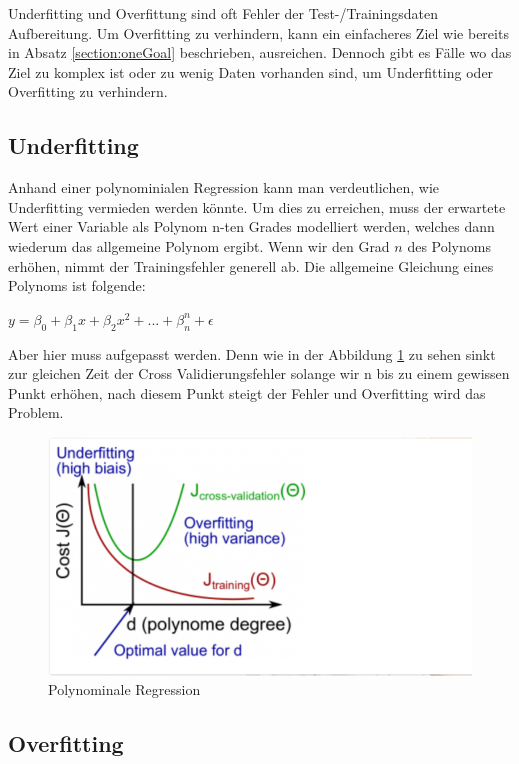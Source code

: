 \documentclass[12pt,oneside,a4paper,parskip]{scrbook}
\begin{document}
Underfitting und Overfittung sind oft Fehler der Test-/Trainingsdaten Aufbereitung. Um Overfitting zu verhindern, kann ein einfacheres Ziel wie bereits in Absatz \ref{section:oneGoal} beschrieben, ausreichen. Dennoch gibt es Fälle wo das Ziel zu komplex ist oder zu wenig Daten vorhanden sind, um Underfitting oder Overfitting zu verhindern.

\subsection{Underfitting}

Anhand einer polynominialen Regression kann man verdeutlichen, wie Underfitting vermieden werden könnte. Um dies zu erreichen, muss der erwartete Wert einer Variable als Polynom n-ten Grades modelliert werden, welches dann wiederum das allgemeine Polynom ergibt. Wenn wir den Grad ${n}$ des Polynoms erhöhen, nimmt der Trainingsfehler generell ab. Die allgemeine Gleichung eines Polynoms ist folgende:

${\displaystyle y=\beta_{0}+\beta_{1}x+\beta_{2}x^{2}+...+\beta_{n}^n+\epsilon}$

Aber hier muss aufgepasst werden. Denn wie in der Abbildung \ref{fig:polyReg} zu sehen sinkt zur gleichen Zeit der Cross Validierungsfehler solange wir n bis zu einem gewissen Punkt erhöhen, nach diesem Punkt steigt der Fehler und Overfitting wird das Problem.

\begin{figure}[h]
	\begin{center}
		\includegraphics[width=15cm]{Bilder/polynomeRegression.png}
		\caption{Polynominale Regression}
		\label{fig:polyReg}
	\end{center}
\end{figure}

\subsection{Overfitting}
\end{document}
